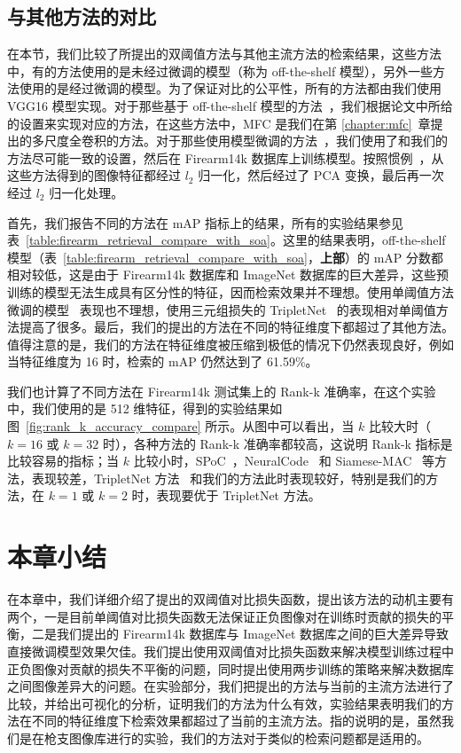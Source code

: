 \subsection{与其他方法的对比}
在本节，我们比较了所提出的双阈值方法与其他主流方法的检索结果，这些方法中，有的方法使用的是未经过微调的模型（称为 off-the-shelf 模型），另外一些方法使用的是经过微调的模型。为了保证对比的公平性，所有的方法都由我们使用 VGG16 模型实现。对于那些基于 off-the-shelf 模型的方法~\cite{Babenko2014NeuralCF,Tolias2015ParticularOR,Babenko2015AggregatingLD,Hao2017MFCAM}，我们根据论文中所给的设置来实现对应的方法，在这些方法中，MFC 是我们在第 \ref{chapter:mfc}~章提出的多尺度全卷积的方法。对于那些使用模型微调的方法~\cite{Gordo2016DeepIR,Radenovic2016CNNIR}，我们使用了和我们的方法尽可能一致的设置，然后在 Firearm14k 数据库上训练模型。按照惯例~\cite{Babenko2015AggregatingLD,Radenovic2016CNNIR}，从这些方法得到的图像特征都经过 $l_2$ 归一化，然后经过了 PCA 变换，最后再一次经过 $l_2$ 归一化处理。

首先，我们报告不同的方法在 mAP 指标上的结果，所有的实验结果参见表~\ref{table:firearm_retrieval_compare_with_soa}。这里的结果表明，off-the-shelf 模型（表~\ref{table:firearm_retrieval_compare_with_soa}，\textbf{上部}）的 mAP 分数都相对较低，这是由于 Firearm14k 数据库和 ImageNet 数据库的巨大差异，这些预训练的模型无法生成具有区分性的特征，因而检索效果并不理想。使用单阈值方法微调的模型~\cite{Radenovic2016CNNIR} 表现也不理想，使用三元组损失的 TripletNet~\cite{Gordo2016DeepIR} 的表现相对单阈值方法提高了很多。最后，我们的提出的方法在不同的特征维度下都超过了其他方法。值得注意的是，我们的方法在特征维度被压缩到极低的情况下仍然表现良好，例如当特征维度为 16 时，检索的 mAP 仍然达到了 61.59\%。

我们也计算了不同方法在 Firearm14k 测试集上的 Rank-k 准确率，在这个实验中，我们使用的是 512 维特征，得到的实验结果如图~\ref{fig:rank_k_accuracy_compare} 所示。从图中可以看出，当 $k$ 比较大时（$k=16$ 或 $k=32$ 时），各种方法的 Rank-k 准确率都较高，这说明 Rank-k 指标是比较容易的指标；当 $k$ 比较小时，SPoC~\cite{Babenko2015AggregatingLD}，NeuralCode~\cite{Babenko2014NeuralCF} 和 Siamese-MAC~\cite{Radenovic2016CNNIR} 等方法，表现较差，TripletNet 方法~\cite{Gordo2016DeepIR} 和我们的方法此时表现较好，特别是我们的方法，在 $k=1$ 或 $k=2$ 时，表现要优于 TripletNet 方法。

\section{本章小结}\label{sec:double_margin_conclusion}
在本章中，我们详细介绍了提出的双阈值对比损失函数，提出该方法的动机主要有两个，一是目前单阈值对比损失函数无法保证正负图像对在训练时贡献的损失的平衡，二是我们提出的 Firearm14k 数据库与 ImageNet 数据库之间的巨大差异导致直接微调模型效果欠佳。我们提出使用双阈值对比损失函数来解决模型训练过程中正负图像对贡献的损失不平衡的问题，同时提出使用两步训练的策略来解决数据库之间图像差异大的问题。在实验部分，我们把提出的方法与当前的主流方法进行了比较，并给出可视化的分析，证明我们的方法为什么有效，实验结果表明我们的方法在不同的特征维度下检索效果都超过了当前的主流方法。指的说明的是，虽然我们是在枪支图像库进行的实验，我们的方法对于类似的检索问题都是适用的。
